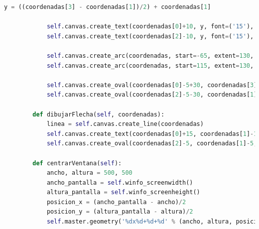 \begin{lstlisting}[language=Python]
			y = ((coordenadas[3] - coordenadas[1])/2) + coordenadas[1]
			
			self.canvas.create_text(coordenadas[0]+10, y, font=('15'), text='0')
			self.canvas.create_text(coordenadas[2]-10, y, font=('15'), text='0')
			
			self.canvas.create_arc(coordenadas, start=-65, extent=130, style='arc')
			self.canvas.create_arc(coordenadas, start=115, extent=130, style='arc')
			
			self.canvas.create_oval(coordenadas[0]-5+30, coordenadas[3]-5-220, coordenadas[0]+5+30, coordenadas[3]+5-220, fill = 'black')
			self.canvas.create_oval(coordenadas[2]-5-30, coordenadas[1]-5+220, coordenadas[2]+5-30, coordenadas[1]+5+220, fill = 'black')
		
		def dibujarFlecha(self, coordenadas):
			linea = self.canvas.create_line(coordenadas)
			self.canvas.create_text(coordenadas[0]+15, coordenadas[1]-10, text='Inicio')
			self.canvas.create_oval(coordenadas[2]-5, coordenadas[1]-5, coordenadas[2]+5,coordenadas[1]+5, fill = 'black')
		
		def centrarVentana(self):
			ancho, altura = 500, 500
			ancho_pantalla = self.winfo_screenwidth()
			altura_pantalla = self.winfo_screenheight()
			posicion_x = (ancho_pantalla - ancho)/2
			posicion_y = (altura_pantalla - altura)/2
			self.master.geometry('%dx%d+%d+%d' % (ancho, altura, posicion_x, posicion_y))
	\end{lstlisting}
	\newpage

